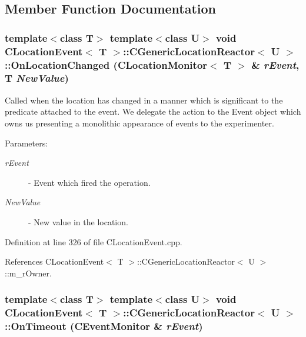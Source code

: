 \subsection{Member Function Documentation}
\subsubsection{\setlength{\rightskip}{0pt plus 5cm}template$<$class T$>$ template$<$class U$>$ void {\bf CLocation\-Event}$<$ T $>$::CGeneric\-Location\-Reactor$<$ U $>$::On\-Location\-Changed ({\bf CLocation\-Monitor}$<$ T $>$ \& {\em r\-Event}, T {\em New\-Value})\hspace{0.3cm}{\tt  [virtual]}}\label{classCLocationEvent_1_1CGenericLocationReactor_a1}


Called when the location has changed in a manner which is significant to the predicate attached to the event. We delegate the action to the Event object which owns us presenting a monolithic appearance of events to the experimenter.\begin{Desc}
\item[Parameters: ]\par
\begin{description}
\item[{\em 
r\-Event}]- Event which fired the operation. \item[{\em 
New\-Value}]- New value in the location. \end{description}
\end{Desc}


Definition at line 326 of file CLocation\-Event.cpp.

References CLocation\-Event$<$ T $>$::CGeneric\-Location\-Reactor$<$ U $>$::m\_\-r\-Owner.
\subsubsection{\setlength{\rightskip}{0pt plus 5cm}template$<$class T$>$ template$<$class U$>$ void {\bf CLocation\-Event}$<$ T $>$::CGeneric\-Location\-Reactor$<$ U $>$::On\-Timeout ({\bf CEvent\-Monitor} \& {\em r\-Event})\hspace{0.3cm}{\tt  [virtual]}}\label{classCLocationEvent_1_1CGenericLocationReactor_a2}


